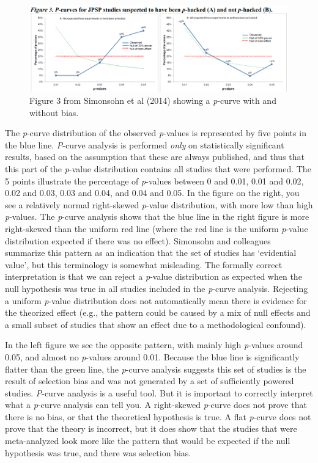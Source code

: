\documentclass[
  oneside]{krantz}
\begin{document}
\begin{figure}

{\centering \includegraphics[width=1\linewidth]{images/pcurve} 

}

\caption{Figure 3 from Simonsohn et al (2014) showing a \emph{p}-curve with and without bias.}\label{fig:pcurve}
\end{figure}

The \emph{p}-curve distribution of the observed \emph{p}-values is represented by five points in the blue line. \emph{P}-curve analysis is performed \emph{only} on statistically significant results, based on the assumption that these are always published, and thus that this part of the \emph{p}-value distribution contains all studies that were performed. The 5 points illustrate the percentage of \emph{p}-values between 0 and 0.01, 0.01 and 0.02, 0.02 and 0.03, 0.03 and 0.04, and 0.04 and 0.05. In the figure on the right, you see a relatively normal right-skewed \emph{p}-value distribution, with more low than high \emph{p}-values. The \emph{p}-curve analysis shows that the blue line in the right figure is more right-skewed than the uniform red line (where the red line is the uniform \emph{p}-value distribution expected if there was no effect). Simonsohn and colleagues summarize this pattern as an indication that the set of studies has `evidential value', but this terminology is somewhat misleading. The formally correct interpretation is that we can reject a \emph{p}-value distribution as expected when the null hypothesis was true in all studies included in the \emph{p}-curve analysis. Rejecting a uniform \emph{p}-value distribution does not automatically mean there is evidence for the theorized effect (e.g., the pattern could be caused by a mix of null effects and a small subset of studies that show an effect due to a methodological confound).

In the left figure we see the opposite pattern, with mainly high \emph{p}-values around 0.05, and almost no \emph{p}-values around 0.01. Because the blue line is significantly flatter than the green line, the \emph{p}-curve analysis suggests this set of studies is the result of selection bias and was not generated by a set of sufficiently powered studies. \emph{P}-curve analysis is a useful tool. But it is important to correctly interpret what a \emph{p}-curve analysis can tell you. A right-skewed \emph{p}-curve does not prove that there is no bias, or that the theoretical hypothesis is true. A flat \emph{p}-curve does not prove that the theory is incorrect, but it does show that the studies that were meta-analyzed look more like the pattern that would be expected if the null hypothesis was true, and there was selection bias.
\end{document}
